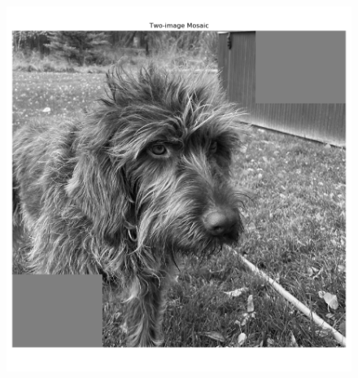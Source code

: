 \documentclass[]{article}
\begin{document}
\begin{figure}[H]
	\centering
	\includegraphics[width=6.5in]{p3_output/img_0_mosaic.png}
\end{figure}
\end{document}
